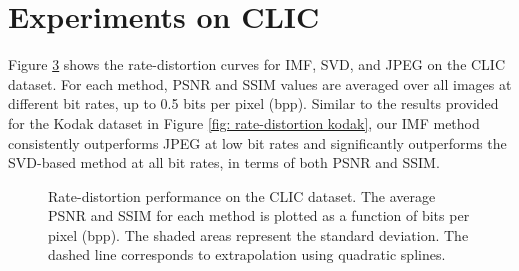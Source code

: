 \section{Experiments on CLIC} \label{app: clic}

Figure \ref{fig: rate-distortion clic} shows the rate-distortion curves for IMF, SVD, and JPEG on the CLIC dataset. For each method, PSNR and SSIM values are averaged over all images at different bit rates, up to 0.5 bits per pixel (bpp). Similar to the results provided for the Kodak dataset in Figure \ref{fig: rate-distortion kodak}, our IMF method consistently outperforms JPEG at low bit rates and significantly outperforms the SVD-based method at all bit rates, in terms of both PSNR and SSIM.

\begin{figure}[t]
	\centering
	\begin{subfigure}{.5\textwidth}
		\centering
		\resizebox{.95\textwidth}{!}{}
		\caption{}
		\label{fig: psnr-vs-bpp clic}
	\end{subfigure}%
	\begin{subfigure}{.5\textwidth}
		\centering
		\resizebox{.95\textwidth}{!}{}
		\caption{}
		\label{fig: ssim-vs-bpp clic}
	\end{subfigure}
	\caption{Rate-distortion performance on the CLIC dataset. The average PSNR and SSIM for each method is plotted as a function of bits per pixel (bpp). The shaded areas represent the standard deviation. The dashed line corresponds to extrapolation using quadratic splines.}
	\label{fig: rate-distortion clic}
\end{figure}


